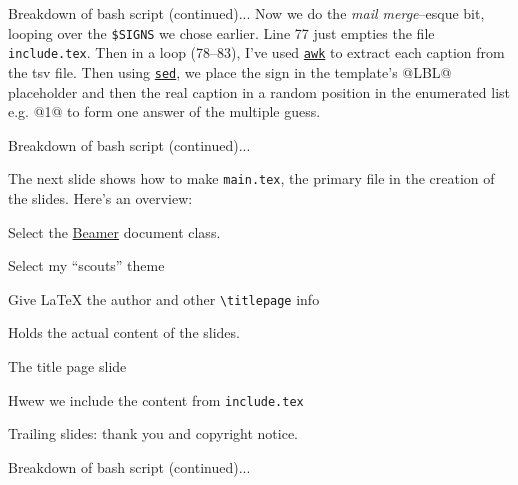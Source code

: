 \begin{frame}
\tiny

\end{frame}

\begin{frame}{Breakdown of bash script (continued)...}
\footnotesize Now we do the \emph{mail merge}--esque bit, looping over the {\tt \$SIGNS} we chose earlier. Line 77 just empties the file {\tt include.tex}. Then in a loop (78--83), I've used \href{https://en.wikipedia.org/wiki/AWK}{\tt awk} to extract each caption from the tsv file. Then using \href{https://en.wikipedia.org/wiki/Sed}{\tt sed}, we place the sign in the template's @LBL@ placeholder and then the real caption in a random position in the enumerated list e.g. @1@ to form one answer of the multiple guess.
\tiny

\end{frame}

\begin{frame}{Breakdown of bash script (continued)...}
\parbox{\textwidth}{\small The next slide shows how to make {\tt main.tex}, the primary file in the creation of the slides. Here's an overview:}

\small
\begin{description}[lines 96--103]
\item[line 90] Select the \href{https://ctan.org/pkg/beamer}{Beamer} document class.
\item[line 91] Select my ``scouts'' theme
\item[lines 92--95] Give \LaTeX{} the author and other {\tt \textbackslash{}titlepage} info
\item[lines 96--103] Holds the actual content of the slides.
\begin{description}[103,104]
\item[98] The title page slide
\item[100] Hwew we include the content from {\tt include.tex}
\item[101,102] Trailing slides: thank you and copyright notice.
\end{description}
\end{description}
\end{frame}

\begin{frame}{Breakdown of bash script (continued)...}
\tiny

\end{frame}


